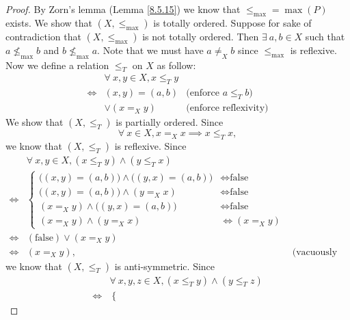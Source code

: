 \begin{proof}
    By Zorn's lemma (Lemma \ref{8.5.15}) we know that \(\leq_{\max} = \max(P)\) exists.
    We show that \((X, \leq_{\max})\) is totally ordered.
    Suppose for sake of contradiction that \((X, \leq_{\max})\) is not totally ordered.
    Then \(\exists\ a, b \in X\) such that \(a \not\leq_{\max} b\) and \(b \not\leq_{\max} a\).
    Note that we must have \(a \neq_X b\) since \(\leq_{\max}\) is reflexive.
    Now we define a relation \(\leq_T\) on \(X\) as follow:
    \begin{align*}
             & \forall\ x, y \in X, x \leq_T y                                   \\
        \iff & (x, y) = (a, b)                 & \text{(enforce \(a \leq_T b\))} \\
             & \lor (x =_X y)                  & \text{(enforce reflexivity)}
    \end{align*}
    We show that \((X, \leq_T)\) is partially ordered.
    Since
    \[
        \forall\ x \in X, x =_X x \implies x \leq_T x,
    \]
    we know that \((X, \leq_T)\) is reflexive.
    Since
    \begin{align*}
             & \forall\ x, y \in X, (x \leq_T y) \land (y \leq_T x)                           \\
        \iff & \begin{cases}
            \big((x, y) = (a, b)\big) \land \big((y, x) = (a, b)\big) & \iff \text{false} \\
            \big((x, y) = (a, b)\big) \land (y =_X x)                 & \iff \text{false} \\
            (x =_X y) \land \big((y, x) = (a, b)\big)                 & \iff \text{false} \\
            (x =_X y) \land (y =_X x)                                 & \iff (x =_X y)
        \end{cases}                                                     \\
        \iff & (\text{false}) \lor (x =_X y)                                                  \\
        \iff & (x =_X y),                                           & \text{(vacuously true)}
    \end{align*}
    we know that \((X, \leq_T)\) is anti-symmetric.
    Since
    \begin{align*}
             & \forall\ x, y, z \in X, (x \leq_T y) \land (y \leq_T z)                                \\
        \iff & \begin{cases}

\end{cases}
\end{align*}
\end{proof}
